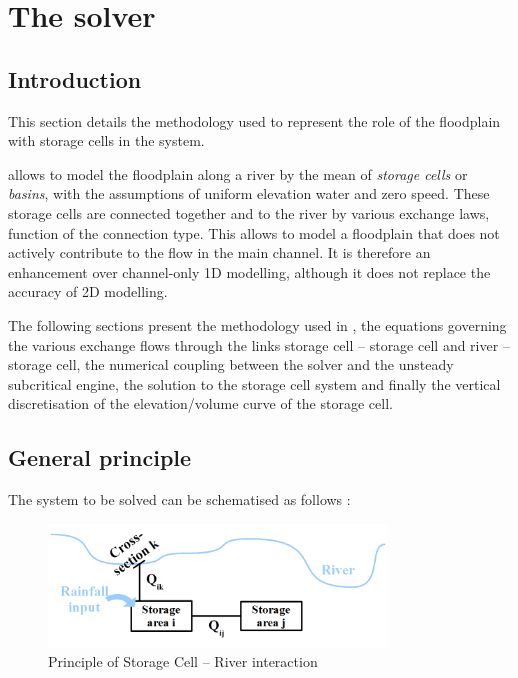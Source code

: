 \chapter{The \casier{} solver}
\label{Chapter4}
\label{SectionCASIER}

\section{Introduction}

This section details the methodology used to represent the role of the floodplain with storage cells in the \mascaret{} system.

\mascaret{} allows to model the floodplain along a river by the mean of \textit{storage cells} or \textit{basins}, with the assumptions of uniform elevation water and zero speed. These storage cells are connected together and to the river by various exchange laws, function of the connection type. This allows to model a floodplain that does not actively contribute to the flow in the main channel. It is therefore an enhancement over channel-only 1D modelling, although it does not replace the accuracy of 2D modelling.

The following sections present the methodology used in \mascaret{}, the equations governing the various exchange flows through the links storage cell -- storage cell and river -- storage cell, the numerical coupling between the \casier{} solver and the unsteady subcritical engine, the solution to the storage cell system and finally the vertical discretisation of the elevation/volume curve of the storage cell.

\section{General principle}

The system to be solved can be schematised as follows :

\begin{figure}[H]
    \begin{center}
     \includegraphics[width=0.8\textwidth]{Figures/CasierRiv.png}
     \caption{Principle of Storage Cell -- River interaction}
    \end{center}
\end{figure}

